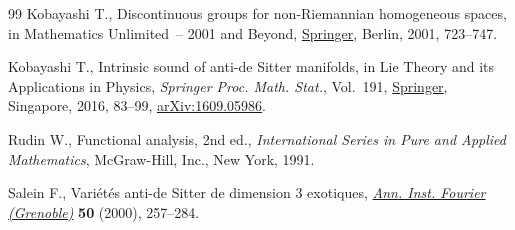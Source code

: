 \documentclass[11pt]{article}
\numberwithin{equation}{section}
\numberwithin{equation}{section}
\begin{document}
\begin{thebibliography}{99}
Kobayashi T., Discontinuous groups for non-{R}iemannian homogeneous spaces, in
 Mathematics Unlimited~-- 2001 and Beyond, \href{https://doi.org/10.1007/978-3-642-56478-9_37}{Springer}, Berlin, 2001, 723--747.

Kobayashi T., Intrinsic sound of anti-de {S}itter manifolds, in Lie Theory and
 its Applications in Physics, \textit{Springer Proc. Math. Stat.}, Vol.~191,
 \href{https://doi.org/10.1007/978-981-10-2636-2_6}{Springer}, Singapore, 2016, 83--99, \href{https://arxiv.org/abs/1609.05986}{arXiv:1609.05986}.

Rudin W., Functional analysis, 2nd ed., \textit{International Series in Pure and
 Applied Mathematics}, McGraw-Hill, Inc., New York, 1991.

Salein F., Vari\'et\'es anti-de {S}itter de dimension 3 exotiques, \href{https://doi.org/10.5802/aif.1754}{\textit{Ann.
 Inst. Fourier (Grenoble)}} \textbf{50} (2000), 257--284.

\end{thebibliography}
\end{document}
